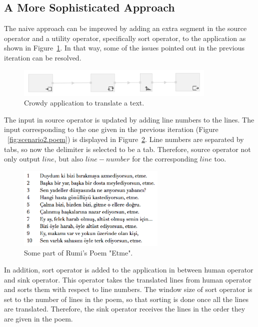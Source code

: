 \subsection{A More Sophisticated Approach}
The naive approach can be improved by adding an extra segment in the source operator and a utility operator, specifically sort operator, to the application as shown in Figure~\ref{fig:scenario2.1}. In that way, some of the issues pointed out in the previous iteration can be resolved.

\begin{figure}[ht]
	\centering
	\includegraphics[width=0.85\textwidth]{figures/scenarios/scenario2_1.png}
	\caption{Crowdy application to translate a text.}
	\label{fig:scenario2.1}
\end{figure}

The input in source operator is updated by adding line numbers to the lines. The input corresponding to the one given in the previous iteration (Figure ~\ref{fig:scenario2.poem}) is displayed in Figure~\ref{fig:scenario2.poem2}. Line numbers are separated by tabs, so now the delimiter is selected to be a tab. Therefore, source operator not only output $line$, but also $line-number$ for the corresponding $line$ too.

\begin{figure}[ht]
	\centering
	\includegraphics[height=150px]{figures/scenarios/poem2.png}
	\caption{Some part of Rumi's Poem "Etme".}
	\label{fig:scenario2.poem2}
\end{figure}

In addition, sort operator is added to the application in between human operator and sink operator. This operator takes the translated lines from human operator and sorts them with respect to line numbers. The window size of sort operator is set to the number of lines in the poem, so that sorting is done once all the lines are translated. Therefore, the sink operator receives the lines in the order they are given in the poem.

